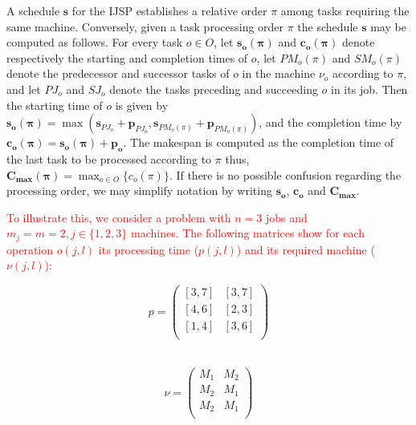 \documentclass[sn-mathphys]{sn-jnl}%
\theoremstyle{thmstyleone}%
\theoremstyle{thmstyletwo}%
\theoremstyle{thmstylethree}%
\newcommand{\review}[1]{\textcolor{red}{#1}} %
\begin{document}
A schedule $\boldsymbol{s}$ for the IJSP establishes a relative order $\pi$ among tasks requiring the same machine. Conversely, given a task processing order $\pi$ the schedule $\boldsymbol{s}$ may be computed as follows. For every task $o \in O$, let $\mathbf{s_o(\pi)}$ and $\mathbf{c_o(\pi)}$ denote respectively the starting and completion times of $o$, let $PM_o(\pi)$ and $SM_o(\pi)$ denote the predecessor and successor tasks of $o$ in the machine $\nu_o$ according to $\pi$, and let $PJ_o$ and $SJ_o$ denote the tasks preceding and succeeding $o$ in its job. Then the starting time of $o$ is given by $\mathbf{s_o(\pi)} = \max(\mathbf{s}_{PJ_o} + \mathbf{p}_{PJ_o},\mathbf{s}_{PM_o(\pi)} + \mathbf{p}_{PM_o(\pi)})$, and the completion time by $\mathbf{c_o(\pi)} = \mathbf{s_o(\pi)} + \mathbf{p_o}$. The makespan is computed as the completion time of the last task to be processed according to $\pi$ thus, $\mathbf{C_{max}(\pi)}=\max_{o\in O}\{c_o(\pi)\}$. If there is no possible confusion regarding the processing order, we may simplify notation by writing $\mathbf{s_o}$, $\mathbf{c_o}$ and $\mathbf{C_{max}}$.

\review{
To illustrate this, we consider a problem with $n=3$ jobs and $m_j=m=2, j \in \{1,2,3\}$ machines. The following matrices show for each operation $o(j,l)$ its processing time ($p(j,l)$) and its required machine ($\nu(j,l)$):\\
}

\noindent\begin{minipage}{.5\linewidth}
\begin{equation*}
\label{processingTimes}
  p =
	\begin{pmatrix}
	[3, 7] & [3, 7]\\
	[4, 6] & [2, 3]\\
	[1, 4] & [3, 6] \\
	\end{pmatrix}
\end{equation*}
\\
\end{minipage}%
\noindent\begin{minipage}{.5\linewidth}
\begin{equation*}
\label{resourceAlloc}
 \nu =
	\begin{pmatrix}
	M_1 & M_2\\
	M_2 & M_1\\
	M_2 & M_1\\
	\end{pmatrix}
\end{equation*}
\\
\end{minipage}%
\end{document}
